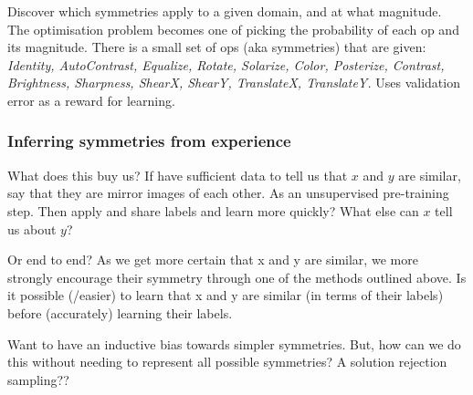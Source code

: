 \cite{Ho2019a, Lim2019, Cubuk2018, Cubuk2019}
Discover which symmetries apply to a given domain, and at what magnitude.
The optimisation problem becomes one of picking the probability of each op and its magnitude.
There is a small set of ops (aka symmetries) that are given:
\textit{Identity, AutoContrast, Equalize, Rotate, Solarize, Color, Posterize, Contrast,
	Brightness, Sharpness, ShearX, ShearY, TranslateX, TranslateY.}
Uses validation error as a reward for learning.


\subsubsection{Inferring symmetries from experience}



What does this buy us? If have sufficient data to tell us that $x$ and $y$ are
similar, say that they are mirror images of each other.
As an unsupervised pre-training step. Then apply and share labels and learn more quickly?
What else can $x$ tell us about $y$?

\cite{Yang2019}

Or end to end? As we get more certain that x and y are similar, we more strongly
encourage their symmetry through one of the methods outlined above.
Is it possible (/easier) to learn that x and y are similar (in terms of their labels) before (accurately) learning their labels.



Want to have an inductive bias towards simpler symmetries. But, how can we do this without needing to represent all possible symmetries?
A solution rejection sampling??


%




